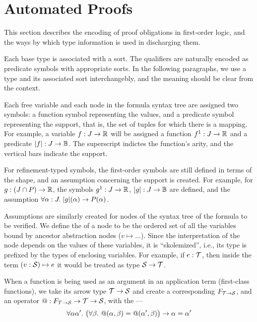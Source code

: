 \section{Automated Proofs}

This section describes the encoding of proof obligations in first-order logic,
and the ways by which type information is used in discharging them.

Each base type is associated with a sort. The qualifiers are naturally encoded
as predicate symbols with appropriate sorts. In the following paragraphs, we
use a type and its associated sort interchangebly, and the meaning should be clear
from the context.

Each free variable and each node in the formula syntax tree are assigned two
symbols: a function symbol representing the values, and a predicate symbol
representing the support, that is, the set of tuples for which there is a mapping.
For example, a variable $f : J\to\R$ will be assigned a function $f^1: J\to\R$
and a predicate $|f|: J\to\B$. The superscript indictes the function's arity,
and the vertical bars indicate the support.

For refinement-typed symbols, the first-order symbols are still defined in terms
of the shape, and an assumption concerning the support is created. For example,
for $g: (J\cap P)\to\R$, the symbols $g^1:J\to\R$, $|g|:J\to\B$ are defined,
and the assumption $\forall \alpha:J.~|g|(\alpha)\limplies P(\alpha)$.

Assumptions are similarly created for nodes of the syntax tree of the formula to
be verified. We define the  of a node to be the ordered set of
all the variables bound by ancestor abstraction nodes ($v\mapsto\ldots$). Since
the interpretation of the node depends on the values of these variables, it is
``skolemized'', i.e., its type is prefixed by the types of enclosing variables.
For example, if $e:\T$, then inside the term $(v:\S)\mapsto e$ it would be treated as
type $\S\to\T$.

When a function is being used as an argument in an application term (first-class functions), 
we take its arrow type $\T\to\S$ and create a corresponding  $F_{\T\to\S}$,
and an operator $@ : F_{\T\to\S}\to\T\to\S$, with the  ---
\begin{equation}
\forall \alpha\alpha'.~ \big(\forall\beta.~ @(\alpha,\beta)=@(\alpha',\beta)\big)\limplies \alpha=\alpha'
\label{automated:extensionality}
\end{equation}

